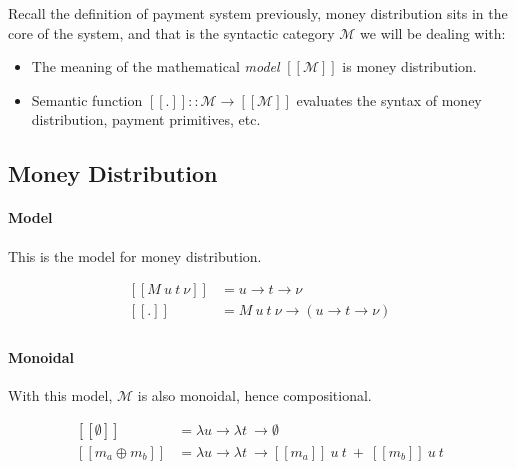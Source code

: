 Recall the definition of payment system previously, money distribution sits in the core of the
system, and that is the syntactic category $\mathcal{M}$ we will be dealing with:

\begin{itemize}
    \item The meaning of the mathematical \textit{model} $[\![\mathcal{M}]\!]$ is money distribution.

    \item Semantic function $[\![.]\!] :: \mathcal{M} \rightarrow [\![\mathcal{M}]\!] $ evaluates
the syntax of money distribution, payment primitives, etc.
\end{itemize}

\subsection{Money Distribution}

\paragraph{Model}

This is the model for money distribution.

\begin{equation}\label{md_model}
    \begin{split}
        [\![M\ u\ t\ \nu]\!] &= u \rightarrow t \rightarrow \nu \\
        [\![.]\!] &= M\ u\ t\ \nu \rightarrow (u \rightarrow t \rightarrow \nu) \\
    \end{split}
\end{equation}

\paragraph{Monoidal}

With this model, $\mathcal{M}$ is also monoidal, hence compositional.

\begin{equation}
    \begin{split}
        [\![\emptyset]\!] &= \lambda u \rightarrow \lambda t\ \rightarrow \emptyset \\
        [\![m_a \oplus m_b]\!] &= \lambda u \rightarrow \lambda t\ \rightarrow
            [\![m_a]\!]\ u\ t\ +\ [\![m_b]\!]\ u\ t \\
    \end{split}
\end{equation}

